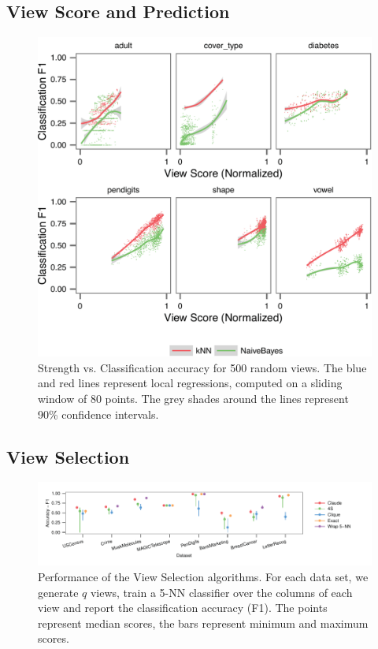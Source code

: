 \subsection{View Score and Prediction}

\begin{figure}[t!]
\centering
\includegraphics[width=\columnwidth]{plots/compare-strength-f1}
\caption{Strength vs. Classification accuracy for 500 random views. The blue
    and red lines represent local regressions, computed on a sliding window of
    80 points. The grey shades around the lines represent 90\% confidence
    intervals.}
\label{pic:strength-vs-f1}
\end{figure}

\subsection{View Selection}
\label{sec:exp-view-selection}

\begin{figure}[t!]
\centering
\includegraphics[width=2\columnwidth]{plots/view-scores}
\caption{Performance of the View Selection algorithms. For each data set, we
    generate $q$ views, train a 5-NN classifier over the columns of each view
    and report the classification accuracy (F1). The points represent
    median scores, the bars represent minimum and maximum scores.} 
\label{pic:column-select-score}
\end{figure}

